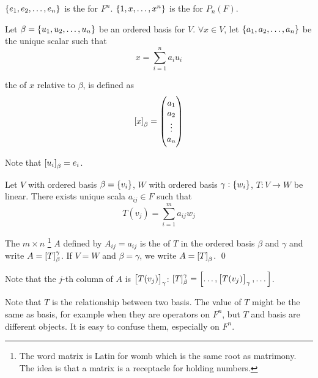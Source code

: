 \begin{definition}
	$\set{e_1, e_2, \dots, e_n}$ is the   for $F^n$. $\set{1, x, \dots, x^n}$ is the   for $P_n (F)$.
\end{definition}

\begin{definition}
	Let $\beta = \set{u_1, u_2, \dots, u_n}$ be an ordered basis for $V$. $\forall x \in V$, let $\set{a_1, a_2, \dots, a_n}$ be the unique scalar such that
	\begin{equation*}
		x = \sum_{i=1}^n a_i u_i
	\end{equation*}
	
	the   of $x$ relative to $\beta$, is defined as 
	\begin{equation}
		\coordinate{x}_\beta = \begin{pmatrix}
		a_1 \\
		a_2 \\
		\vdots \\
		a_n
		\end{pmatrix}
	\end{equation}
	
	Note that $\coordinate{u_i}_\beta = e_i$.
\end{definition}

\begin{definition}
	Let $V$ with ordered basis $\beta=\set{v_i}$, $W$ with ordered basis $\gamma:\set{w_i}$, $T:V \rightarrow W$ be linear. There exists unique scala $a_{ij} \in F$ such that
	\begin{equation}
		T(v_j) = \sum_{i=1}^m a_{ij} w_j
	\end{equation}
	
	The $m \times n$ \footnote{The word matrix is Latin for womb which is the same root as matrimony. The idea is that a matrix is a receptacle for holding numbers. } $A$ defined by $A_{ij}=a_{ij}$ is the   of $T$ in the ordered basis $\beta$ and $\gamma$ and write $A=\coordinate{T}_\beta^\gamma$. If $V = W$ and $\beta = \gamma$, we write $A=\coordinate{T}_\beta$.
	\qed
\end{definition}

	Note that the $j$-th column of $A$ is $\coordinate{T(v_j)}_\gamma$: $\coordinate{T}_\beta^\gamma = \coordinate{\dots, \coordinate{T(v_j)}_\gamma, \dots}$.
	
	Note that $T$ is the relationship between two basis. The value of $T$ might be the same as basis, for example when they are operators on $F^n$, but $T$ and basis are different objects. It is easy to confuse them, especially on $F^n$.
	

